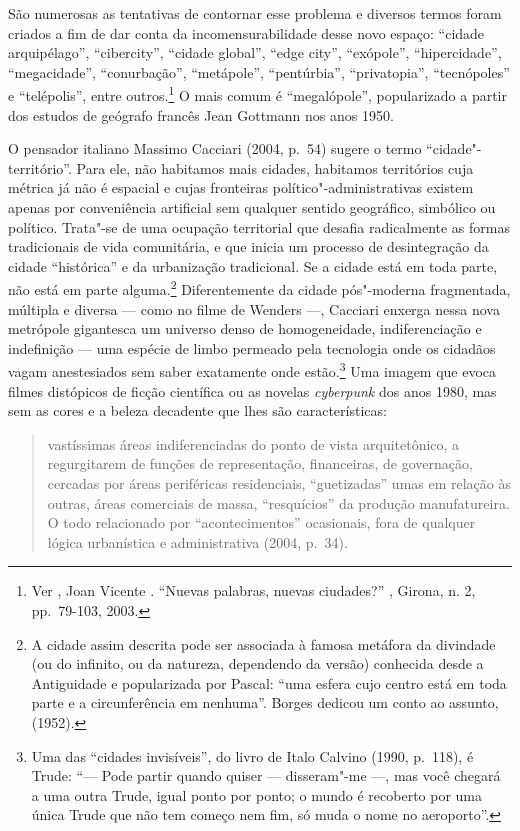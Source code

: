 São numerosas as tentativas de contornar esse problema e diversos termos
foram criados a fim de dar conta da incomensurabilidade desse novo
espaço: ``cidade arquipélago'', ``cibercity'', ``cidade global'', ``edge
city'', ``exópole'', ``hipercidade'', ``megacidade'', ``conurbação'',
``metápole'', ``pentúrbia'', ``privatopia'', ``tecnópoles'' e
``telépolis'', entre outros.\footnote{Ver , Joan Vicente . ``Nuevas %
  palabras, nuevas ciudades?'' {}, Girona, n.
  2, pp.~79-103, 2003.} O mais comum é ``megalópole'', popularizado a
partir dos estudos de geógrafo francês Jean Gottmann nos anos 1950.

O pensador italiano Massimo Cacciari (2004, p.~54) sugere o termo
``cidade"-território''. Para ele, não habitamos mais cidades, habitamos
territórios cuja métrica já não é espacial e cujas fronteiras
político"-administrativas existem apenas por conveniência artificial sem
qualquer sentido geográfico, simbólico ou político. Trata"-se de uma
ocupação territorial que desafia radicalmente as formas tradicionais de
vida comunitária, e que inicia um processo de desintegração da cidade
``histórica'' e da urbanização tradicional. Se a cidade está em toda
parte, não está em parte alguma.\footnote{A cidade assim descrita pode
  ser associada à famosa metáfora da divindade (ou do infinito, ou da
  natureza, dependendo da versão) conhecida desde a Antiguidade e
  popularizada por Pascal: ``uma esfera cujo centro está em toda parte e
  a circunferência em nenhuma''. Borges dedicou um conto ao assunto,
  {} (1952).} Diferentemente da cidade
pós"-moderna fragmentada, múltipla e diversa --- como no filme de Wenders
---, Cacciari enxerga nessa nova metrópole gigantesca um universo denso
de homogeneidade, indiferenciação e indefinição --- uma espécie de limbo
permeado pela tecnologia onde os cidadãos vagam anestesiados sem saber
exatamente onde estão.\footnote{Uma das ``cidades invisíveis'', do livro
  de Italo Calvino (1990, p.~118), é Trude: ``--- Pode partir quando
  quiser --- disseram"-me ---, mas você chegará a uma outra Trude, igual
  ponto por ponto; o mundo é recoberto por uma única Trude que não tem
  começo nem fim, só muda o nome no aeroporto''.} Uma imagem que evoca
filmes distópicos de ficção científica ou as novelas \emph{cyberpunk}
dos anos 1980, mas sem as cores e a beleza decadente que lhes são
características:

\begin{quote}
vastíssimas áreas indiferenciadas do ponto de vista arquitetônico, a
regurgitarem de funções de representação, financeiras, de governação,
cercadas por áreas periféricas residenciais, ``guetizadas'' umas em
relação às outras, áreas comerciais de massa, ``resquícios'' da produção
manufatureira. O todo relacionado por ``acontecimentos'' ocasionais, fora
de qualquer lógica urbanística e administrativa (2004, p.~34).
\end{quote}

